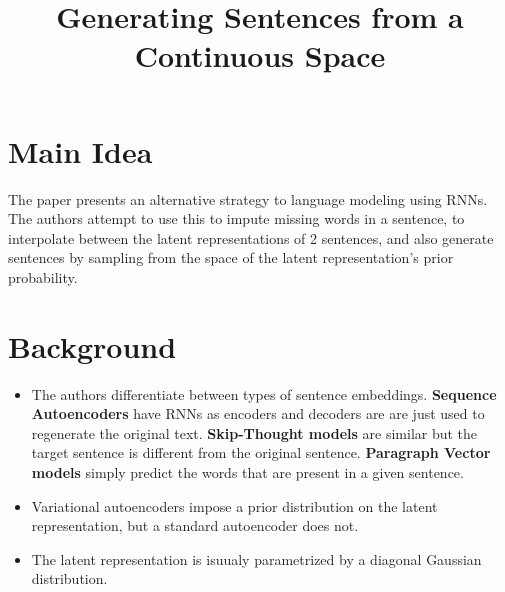 \documentclass[12pt]{scrartcl}
\begin{document}
\title{Generating Sentences from a Continuous Space}
\author{}
\date{}
\maketitle

\section{Main Idea}
  The paper presents an alternative strategy to language modeling using RNNs. The authors attempt to use this to impute missing words in a sentence, to interpolate between the latent representations of 2 sentences, and also generate sentences by sampling from the space of the latent representation's prior probability. \cite{bowman2016generating}

\section{Background}
  \begin{itemize}
    \item The authors differentiate between types of sentence embeddings. \textbf{Sequence Autoencoders} have RNNs as encoders and decoders are are just used to regenerate the original text. \textbf{Skip-Thought models} are similar but the target sentence is different from the original sentence. \textbf{Paragraph Vector models} simply predict the words that are present in a given sentence.
    \item Variational autoencoders impose a prior distribution on the latent representation, but a standard autoencoder does not.
    \item The latent representation is isuualy parametrized by a diagonal Gaussian distribution.
  \end{itemize}
\end{document}

